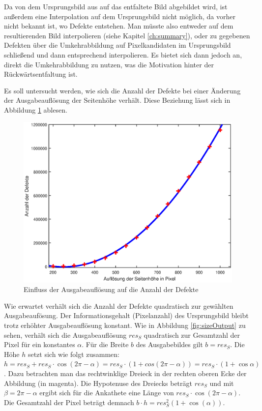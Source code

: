 Da von dem Ursprungsbild aus auf das entfaltete Bild abgebildet wird, ist außerdem eine Interpolation auf dem Ursprungsbild nicht möglich, da vorher nicht bekannt ist, wo Defekte entstehen. Man müsste also entweder auf dem resultierenden Bild interpolieren (siehe Kapitel \ref{ch:summary}), oder zu gegebenen Defekten über die Umkehrabbildung auf Pixelkandidaten im Ursprungsbild schließend und dann entsprechend interpolieren.
Es bietet sich dann jedoch an, direkt die Umkehrabbildung zu nutzen, was die Motivation hinter der Rückwärtsentfaltung ist.

Es soll untersucht werden, wie sich die Anzahl der Defekte bei einer Änderung der Ausgabeauflösung der Seitenhöhe verhält. Diese Beziehung lässt sich in Abbildung \ref{fig:influenceRes} ablesen.
\begin{figure}[!htb]
	\centering
	\includegraphics[width=\textwidth]{images/numberOfHoles.eps}
	\caption{Einfluss der Ausgabeauflösung auf die Anzahl der Defekte}
	\label{fig:influenceRes}
\end{figure}

Wie erwartet verhält sich die Anzahl der Defekte quadratisch zur gewählten Ausgabeaufösung. Der Informationsgehalt (Pixelanzahl) des Ursprungsbild bleibt trotz erhöhter Ausgabeauflösung konstant. Wie in Abbildung \ref{fig:sizeOutput} zu sehen, verhält sich die Ausgabeauflösung $res_S$ quadratisch zur Gesamtzahl der Pixel für ein konstantes $\alpha$. Für die Breite $b$ des Ausgabebildes gilt $b = res_S$.
Die Höhe $h$ setzt sich wie folgt zusammen: $h = res_S + res_S\cdot\cos(2\pi-\alpha) = res_S\cdot(1 + cos(2\pi-\alpha)) = res_S\cdot(1+\cos\alpha)$. Dazu betrachten man das rechtwinklige Dreieck in der rechten oberen Ecke der Abbildung (in magenta). Die Hypotenuse des Dreiecks beträgt $res_S$ und mit $\beta = 2\pi - \alpha$ ergibt sich für die Ankathete eine Länge von $res_S\cdot\cos(2\pi-\alpha)$. Die Gesamtzahl der Pixel beträgt demnach $b\cdot h = res_S^2(1+\cos(\alpha))$.

